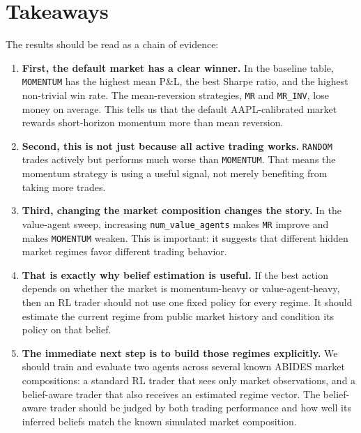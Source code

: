 \documentclass[11pt]{article}
\begin{document}
\section{Takeaways}

The results should be read as a chain of evidence:

\begin{enumerate}
    \item \textbf{First, the default market has a clear winner.}
    In the baseline table, \texttt{MOMENTUM} has the highest mean P\&L, the
    best Sharpe ratio, and the highest non-trivial win rate. The
    mean-reversion strategies, \texttt{MR} and \texttt{MR\_INV}, lose money on
    average. This tells us that the default AAPL-calibrated market rewards
    short-horizon momentum more than mean reversion.

    \item \textbf{Second, this is not just because all active trading works.}
    \texttt{RANDOM} trades actively but performs much worse than
    \texttt{MOMENTUM}. That means the momentum strategy is using a useful
    signal, not merely benefiting from taking more trades.

    \item \textbf{Third, changing the market composition changes the story.}
    In the value-agent sweep, increasing \texttt{num\_value\_agents} makes
    \texttt{MR} improve and makes \texttt{MOMENTUM} weaken. This is important:
    it suggests that different hidden market regimes favor different trading
    behavior.

    \item \textbf{That is exactly why belief estimation is useful.}
    If the best action depends on whether the market is momentum-heavy or
    value-agent-heavy, then an RL trader should not use one fixed policy for
    every regime. It should estimate the current regime from public market
    history and condition its policy on that belief.

    \item \textbf{The immediate next step is to build those regimes explicitly.}
    We should train and evaluate two agents across several known ABIDES market
    compositions: a standard RL trader that sees only market observations, and
    a belief-aware trader that also receives an estimated regime vector. The
    belief-aware trader should be judged by both trading performance and how
    well its inferred beliefs match the known simulated market composition.
\end{enumerate}
\end{document}
